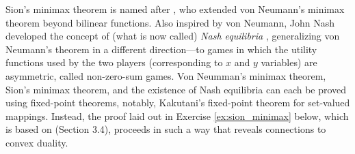 Sion's minimax theorem is named after \cite{sion1958general}, who extended  
von Neumann's minimax theorem \cite{vonneumann1928theorie} beyond bilinear   
functions. Also inspired by von Neumann, John Nash developed the concept of
(what is now called) \emph{Nash equilibria} \cite{nash1950equilibrium,
  nash1951noncooperative}, generalizing von Neumann's theorem in a different   
direction---to games in which the utility functions used by the two players  
(corresponding to $x$ and $y$ variables) are asymmetric, called non-zero-sum
games. Von Neumman's minimax theorem, Sion's minimax theorem, and the existence
of Nash equilibria can each be proved using fixed-point theorems, notably,
Kakutani's fixed-point theorem \cite{kakutani1941generalization} for set-valued
mappings. Instead, the proof laid out in Exercise \ref{ex:sion_minimax} below, 
which is based on \cite{bental2023convex} (Section 3.4), proceeds in such a way
that reveals connections to convex duality.    

\clearpage

